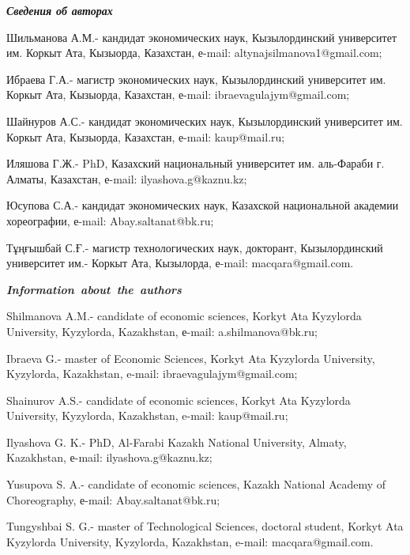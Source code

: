 \begin{info}
\hspace{1em}\emph{{\bfseries Сведения об авторах}}

Шильманова А.М.- кандидат экономических наук, Кызылординский
университет им. Коркыт Ата, Кызыорда, Казахстан, е-mail:
altynajsilmanova1@gmail.com;

Ибраева Г.А.- магистр экономических наук, Кызылординский университет
им.  Коркыт Ата, Кызыорда, Казахстан, е-mail:
ibraevagulajym@gmail.com;

Шайнуров А.С.- кандидат экономических наук, Кызылординский университет
им. Коркыт Ата, Кызыорда, Казахстан, е-mail: kaup@mail.ru;

Иляшова Г.Ж.- PhD, Казахский национальный университет им. аль-Фараби
г.  Алматы, Казахстан, е-mail: ilyashova.g@kaznu.kz;

Юсупова С.А.- кандидат экономических наук, Казахской национальной
академии хореографии, е-mail: Abay.saltanat@bk.ru;

Тұңғышбай С.Ғ.- магистр технологических наук, докторант,
Кызылординский университет им.- Коркыт Ата, Кызылорда, е-mail:
macqara@gmail.com.

\hspace{1em}\emph{{\bfseries Information~about~the~authors}}

Shilmanova A.M.- candidate of economic sciences, Korkyt Ata Kyzylorda
University, Kyzylorda, Kazakhstan, е-mail: a.shilmanova@bk.ru;

Ibraeva G.- master of Economic Sciences, Korkyt Ata Kyzylorda
University, Kyzylorda, Kazakhstan, e-mail: ibraevagulajym@gmail.com;

Shainurov A.S.- candidate of economic sciences, Korkyt Ata Kyzylorda
University, Kyzylorda, Kazakhstan, e-mail: kaup@mail.ru;

Ilyashova G. K.- PhD, Al-Farabi Kazakh National University, Almaty,
Kazakhstan, е-mail: ilyashova.g@kaznu.kz;

Yusupova S. A.- candidate of economic sciences, Kazakh National
Academy of Choreography, е-mail: Abay.saltanat@bk.ru;

Tungyshbai S. G.- master of Technological Sciences, doctoral student,
Korkyt Ata Kyzylorda University, Kyzylorda, Kazakhstan, e-mail:
macqara@gmail.com.
\end{info}
